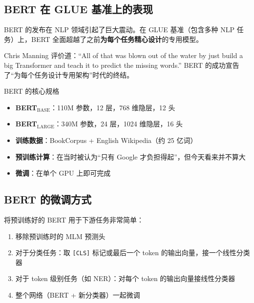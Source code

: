 \documentclass[a4paper]{article}
\begin{document}
\subsection{BERT 在 GLUE 基准上的表现}

BERT 的发布在 NLP 领域引起了巨大震动。在 GLUE 基准（包含多种 NLP 任务）上，BERT 全面超越了之前\textbf{为每个任务精心设计}的专用模型。




Chris Manning 评价道：``All of that was blown out of the water by just build a big Transformer and teach it to predict the missing words.'' BERT 的成功宣告了``为每个任务设计专用架构''时代的终结。

\begin{importantbox}{BERT 的核心规格}
\begin{itemize}
    \item \textbf{BERT$_{\text{BASE}}$}：110M 参数，12 层，768 维隐层，12 头
    \item \textbf{BERT$_{\text{LARGE}}$}：340M 参数，24 层，1024 维隐层，16 头
    \item \textbf{训练数据}：BookCorpus + English Wikipedia（约 25 亿词）
    \item \textbf{预训练计算}：在当时被认为``只有 Google 才负担得起''，但今天看来并不算大
    \item \textbf{微调}：在单个 GPU 上即可完成
\end{itemize}
\end{importantbox}

\subsection{BERT 的微调方式}

将预训练好的 BERT 用于下游任务非常简单：





\begin{enumerate}
    \item 移除预训练时的 MLM 预测头
    \item 对于分类任务：取 \texttt{[CLS]} 标记或最后一个 token 的输出向量，接一个线性分类器
    \item 对于 token 级别任务（如 NER）：对每个 token 的输出向量接线性分类器
    \item 整个网络（BERT + 新分类器）一起微调
\end{enumerate}
\end{document}
